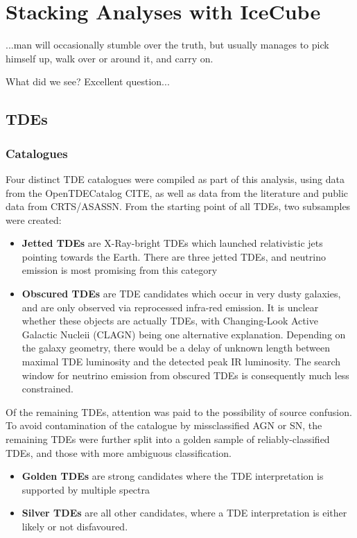 \setchapterpreamble[u]{\margintoc}
\chapter{Stacking Analyses with IceCube}
\begin{fquote}...man will occasionally stumble over the truth, but usually manages to pick himself up, walk over or around it, and carry on. 
\end{fquote}


What did we see? Excellent question...

\section{TDEs}

\subsection{Catalogues}

Four distinct TDE catalogues were compiled as part of this analysis, using data from the OpenTDECatalog CITE, as well as data from the literature and public data from CRTS/ASASSN. From the starting point of all TDEs, two subsamples were created:

\begin{itemize}
	\item \textbf{Jetted TDEs} are X-Ray-bright TDEs which launched relativistic jets pointing towards the Earth. There are three jetted TDEs, and neutrino emission is most promising from this category
	
	\item \textbf{Obscured TDEs} are TDE candidates which occur in very dusty galaxies, and are only observed via reprocessed infra-red emission. It is unclear whether these objects are actually TDEs, with Changing-Look Active Galactic Nucleii (CLAGN) being one alternative explanation. Depending on the galaxy geometry, there would be a delay of unknown length between maximal TDE luminosity and the detected peak IR luminosity. The search window for neutrino emission from obscured TDEs is consequently much less constrained.
\end{itemize}
Of the remaining TDEs, attention was paid to the possibility of source confusion. To avoid contamination of the catalogue by missclassified AGN or SN, the remaining TDEs were further split into a golden sample of reliably-classified TDEs, and those with more ambiguous classification.
\begin{itemize}
	\item \textbf{Golden TDEs} are strong candidates where the TDE interpretation is supported by multiple spectra
	\item \textbf{Silver TDEs} are all other candidates, where a TDE interpretation is either likely or not disfavoured.
\end{itemize}

